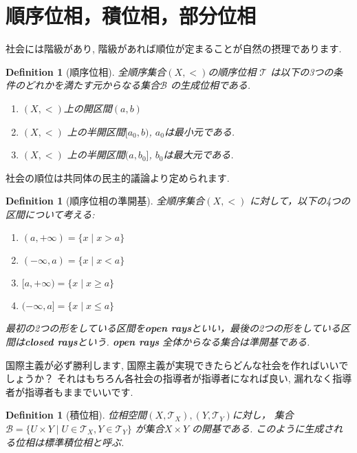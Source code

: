 \documentclass[dvipdfmx]{jbook}
\newtheorem{definition}[theorem]{Definition}
\theoremstyle{remark}
\theoremstyle{plain}
\begin{document}
\section{順序位相，積位相，部分位相}

社会には階級があり, 階級があれば順位が定まることが自然の摂理であります.
\begin{definition}[順序位相]
全順序集合$(X,<)$の順序位相 $\mathcal{T}$ は以下の3つの条件のどれかを満たす元からなる集合$\mathcal{B}$ の生成位相である.

\begin{enumerate}
	\item $\left( X, < \right) $上の開区間$\left( a,b \right) $
	\item $\left( X,< \right) $ 上の半開区間$[a_0,b)$, $a_0$は最小元である.
	\item  $\left( X, < \right) $ 上の半開区間$(a,b_0]$, $b_0$は最大元である.
\end{enumerate}

\end{definition}

社会の順位は共同体の民主的議論より定められます.

\begin{definition}[順序位相の準開基]
全順序集合$\left( X,< \right) $ に対して，以下の4つの区間について考える:
	\begin{enumerate}
		\item $(a,+\infty)=\{x  \mid x>a	\}$
		\item $(-\infty , a)= \{ x  \mid  x< a \}$
		\item $[a,+\infty)= \{ x \mid x \ge a \}$
		\item  $(-\infty,a]= \{x  \mid x \le a \}$
	\end{enumerate}
	最初の2つの形をしている区間を\textbf{open rays}といい，最後の2つの形をしている区間は\textbf{closed rays}という.
	\textbf{open rays} 全体からなる集合は準開基である.
\end{definition}

国際主義が必ず勝利します, 国際主義が実現できたらどんな社会を作ればいいでしょうか？ それはもちろん各社会の指導者が指導者になれば良い, 漏れなく指導者が指導者もままでいいです.

\begin{definition}[積位相]
	位相空間$(X,\mathcal{T}_X),(Y,\mathcal{T}_Y)$に対し， 
	集合$\mathcal{B}=\{ U \times Y  \mid U \in \mathcal{T}_X, Y \in \mathcal{T}_Y\}$ が集合$X \times Y$ の開基である.
	このように生成される位相は標準積位相と呼ぶ.
\end{definition}
\end{document}
